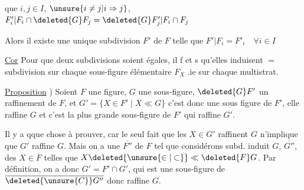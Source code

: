 
que  $i,j\in I$, $\unsure{i\ne j|i\Rightarrow j}$, $F'_i|F_i\cap\deleted{G}F_j=\deleted{G}F'_j|F_i\cap F_j$

Alors il existe une unique subdivision $F'$ de $F$ telle que $F'|F_i=F'_i\quad\forall i\in I$

\uline{Cor} Pour que deux subdivisions  soient égales, il f et s qu'elles induisent  $=$ subdivision sur chaque sous-figure élémentaire $F_X$ .ie sur chaque multistrat.

 \uline{Proposition} ) Soient $F$ une figure, $G$ une sous-figure, $\deleted{G}F'$ un raffinement de $F$, et $G'=\{X\in F'\mid X\ll G\}$ c'est donc une sous figure de $F'$,  elle raffine $G$ et c'est  la plus grande sous-figure de $F'$ qui raffine $G'$.



 Il y a qque chose à prouver, car le seul fait que les $X\in G'$ raffinent $G$ n'implique  que $G'$ raffine $G$. Mais on a une   $\overline{F''}$ de $F$ tel que  considérons  subd. induit  $G$, $\overline{G''}$,  des $X\in\overline{F}$ telles que $X\deleted{\unsure{\in|\subset}}\ll \deleted{F}G$.  Par définition, on a donc $G'=F'\cap G'$, qui est  une sous-figure de $\overline{\deleted{\unsure{C}}G''}$ donc raffine $G$.
